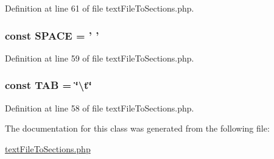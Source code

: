 Definition at line 61 of file text\+File\+To\+Sections.\+php.

\hypertarget{class_c_text_file_to_sections_a80547d19853b375decb59c8851e2be8e}{
\subsubsection[{S\+P\+A\+C\+E}]{\setlength{\rightskip}{0pt plus 5cm}const S\+P\+A\+C\+E = ' '}}\label{class_c_text_file_to_sections_a80547d19853b375decb59c8851e2be8e}


Definition at line 59 of file text\+File\+To\+Sections.\+php.

\hypertarget{class_c_text_file_to_sections_a4383af7457a1680a60c012aebc4d9dac}{
\subsubsection[{T\+A\+B}]{\setlength{\rightskip}{0pt plus 5cm}const T\+A\+B = \char`\"{}\textbackslash{}t\char`\"{}}}\label{class_c_text_file_to_sections_a4383af7457a1680a60c012aebc4d9dac}


Definition at line 58 of file text\+File\+To\+Sections.\+php.



The documentation for this class was generated from the following file\+:\begin{DoxyCompactItemize}
\item 
\hyperlink{text_file_to_sections_8php}{text\+File\+To\+Sections.\+php}\end{DoxyCompactItemize}
